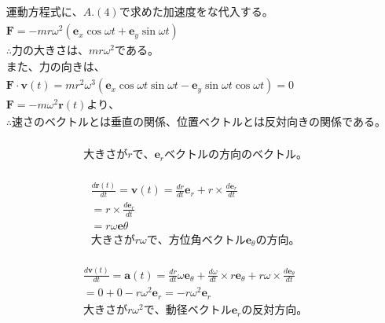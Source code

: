 \documentclass[dvipdfmx,uplatex]{jsarticle}
\begin{document}
  \begin{equation}
    \begin{aligned}
        &運動方程式に、A.(4)で求めた加速度をな代入する。\nonumber\\
        &\bm{F}=-mr\omega^2(\bm{e}_{x}\cos \omega t + \bm{e}_{y}\sin \omega t)\nonumber\\
        &\therefore 力の大きさは、mr\omega^2 である。\nonumber\\
        &また、力の向きは、\nonumber\\
        &\bm{F} \cdot \bm{v}(t) = mr^2\omega^3(\bm{e}_{x}\cos \omega t \sin \omega t - \bm{e}_{y}\sin \omega t \cos\omega t)=0\nonumber\\
        &\bm{F}=-m\omega^2\bm{r}(t)より、\nonumber\\
        &\therefore 速さのベクトルとは垂直の関係、位置ベクトルとは反対向きの関係である。\nonumber\\
    \end{aligned}
  \end{equation}

  \begin{equation}
    \begin{aligned}
        &大きさがrで、\bm{e}_{r}ベクトルの方向のベクトル。\nonumber\\
    \end{aligned}
  \end{equation}

  \begin{equation}
    \begin{aligned}
        &\frac{d\bm{r}(t)}{dt} = \bm{v}(t) = \frac{dr}{dt}\bm{e}_{r} + r \times \frac{d\bm{e}_{r}}{dt}\nonumber\\
        &=r \times  \frac{d\bm{e}_{r}}{dt}\nonumber\\
        &=r\omega \bm{e}{\theta}\nonumber\\
        &大きさがr\omega で、方位角ベクトル\bm{e}_{\theta}の方向。\nonumber\\
    \end{aligned}
  \end{equation}

  \begin{equation}
    \begin{aligned}
        &\frac{d\bm{v}(t)}{dt} = \bm{a}(t) = \frac{dr}{dt}\omega\bm{e}_{\theta} + \frac{d\omega}{dt} \times r\bm{e}_{\theta} + r\omega \times \frac{d\bm{e}_{\theta}}{dt}\nonumber\\
        &=0 + 0 -r\omega^2\bm{e}_{r} = -r\omega^2\bm{e}_{r}\nonumber\\
        &大きさがr\omega^2 で、動径ベクトル\bm{e}_{r}の反対方向。\nonumber\\
    \end{aligned}
  \end{equation}
\end{document}
